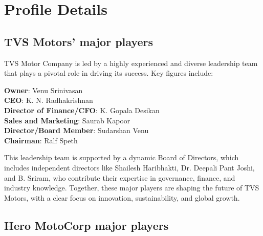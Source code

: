 \section{Profile Details}

\subsection{TVS Motors' major players}

TVS Motor Company is led by a highly experienced and diverse leadership team that plays a pivotal role in driving its success. Key figures include:

\textbf{Owner}: Venu Srinivasan \cite{tvsmotorMotorCompany} \\
\textbf{CEO}: K. N. Radhakrishnan\\
\textbf{Director of Finance/CFO}: K. Gopala Desikan\\
\textbf{Sales and Marketing}: Saurab Kapoor\\
\textbf{Director/Board Member}: Sudarshan Venu\\
\textbf{Chairman}: Ralf Speth

This leadership team is supported by a dynamic Board of Directors, which includes independent directors like Shailesh Haribhakti, Dr. Deepali Pant Joshi, and B. Sriram, who contribute their expertise in governance, finance, and industry knowledge. Together, these major players are shaping the future of TVS Motors, with a clear focus on innovation, sustainability, and global growth\cite{tvsmotorMotorCompany}.

\subsection{Hero MotoCorp major players}

